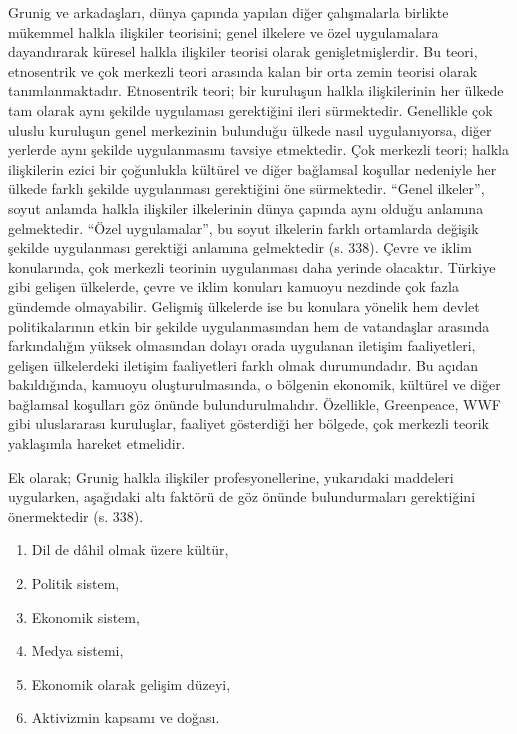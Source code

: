 \documentclass[
]{book}
\providecommand{\tightlist}{%
  \setlength{\itemsep}{0pt}\setlength{\parskip}{0pt}}
\begin{document}
Grunig ve arkadaşları, dünya çapında yapılan diğer çalışmalarla birlikte mükemmel halkla ilişkiler teorisini; genel ilkelere ve özel uygulamalara dayandırarak küresel halkla ilişkiler teorisi olarak genişletmişlerdir. Bu teori, etnosentrik ve çok merkezli teori arasında kalan bir orta zemin teorisi olarak tanımlanmaktadır. Etnosentrik teori; bir kuruluşun halkla ilişkilerinin her ülkede tam olarak aynı şekilde uygulaması gerektiğini ileri sürmektedir. Genellikle çok uluslu kuruluşun genel merkezinin bulunduğu ülkede nasıl uygulanıyorsa, diğer yerlerde aynı şekilde uygulanmasını tavsiye etmektedir. Çok merkezli teori; halkla ilişkilerin ezici bir çoğunlukla kültürel ve diğer bağlamsal koşullar nedeniyle her ülkede farklı şekilde uygulanması gerektiğini öne sürmektedir. ``Genel ilkeler'', soyut anlamda halkla ilişkiler ilkelerinin dünya çapında aynı olduğu anlamına gelmektedir. ``Özel uygulamalar'', bu soyut ilkelerin farklı ortamlarda değişik şekilde uygulanması gerektiği anlamına gelmektedir (s. 338). \citep{grunig2008excellence} Çevre ve iklim konularında, çok merkezli teorinin uygulanması daha yerinde olacaktır. Türkiye gibi gelişen ülkelerde, çevre ve iklim konuları kamuoyu nezdinde çok fazla gündemde olmayabilir. Gelişmiş ülkelerde ise bu konulara yönelik hem devlet politikalarının etkin bir şekilde uygulanmasından hem de vatandaşlar arasında farkındalığın yüksek olmasından dolayı orada uygulanan iletişim faaliyetleri, gelişen ülkelerdeki iletişim faaliyetleri farklı olmak durumundadır. Bu açıdan bakıldığında, kamuoyu oluşturulmasında, o bölgenin ekonomik, kültürel ve diğer bağlamsal koşulları göz önünde bulundurulmalıdır. Özellikle, Greenpeace, WWF gibi uluslararası kuruluşlar, faaliyet gösterdiği her bölgede, çok merkezli teorik yaklaşımla hareket etmelidir.

Ek olarak; Grunig halkla ilişkiler profesyonellerine, yukarıdaki maddeleri uygularken, aşağıdaki altı faktörü de göz önünde bulundurmaları gerektiğini önermektedir (s. 338). \citep{grunig2008excellence}

\begin{enumerate}
\def\labelenumi{\arabic{enumi}.}
\tightlist
\item
  Dil de dâhil olmak üzere kültür,
\item
  Politik sistem,
\item
  Ekonomik sistem,
\item
  Medya sistemi,
\item
  Ekonomik olarak gelişim düzeyi,
\item
  Aktivizmin kapsamı ve doğası.
\end{enumerate}
\end{document}
